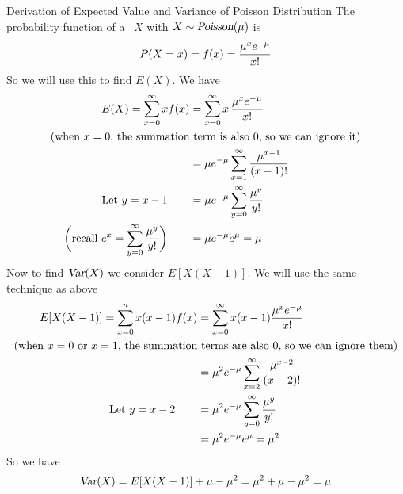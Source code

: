 \begin{theory}{Derivation of Expected Value and Variance of Poisson Distribution}
The probability function of a \rv~$X$ with $X \sim \operatorname{\textsl{Poisson}}(\mu)$ is
\[
    P(X = x) = f(x) = \frac{\mu^x e^{-\mu}}{x!}
\]
So we will use this to find $E(X)$. We have
\begin{align*}
    E(X) = \sum_{x = 0}^{\infty} xf(x) 
    &= \sum_{x = 0}^{\infty} x\,\frac{\mu^x e^{-\mu}}{x!} \\
    \text{(when $x = 0$, the summation}&\text{ term is also 0, so we can ignore it)} \\
    &= \mu e^{-\mu} \sum_{x = 1}^{\infty} \frac{\mu^{x-1}}{(x-1)!} \\
    \text{Let $y = x - 1$} \qquad
    &= \mu e^{-\mu} \sum_{y = 0}^{\infty} \frac{\mu^y}{y!} \\
    \biggl(\text{recall } e^x = \sum_{y = 0}^{\infty}\frac{\mu^y}{y!}\biggr) \qquad
    &= \mu e^{-\mu} e^{\mu} = \mu
\end{align*}
Now to find $\operatorname{\textsl{Var}}(X)$ we consider $E[X(X-1)]$. We will use the same technique as above
\begin{align*}
    E[X(X-1)] = \sum_{x = 0}^{n} x(x-1)f(x)
    &= \sum_{x = 0}^{\infty} x(x-1) \frac{\mu^x e^{-\mu}}{x!} \\
    \text{(when $x = 0$ or $x = 1$, the summation}&\text{ terms are also 0, so we can ignore them)} \\
    &= \mu^2  e^{-\mu} \sum_{x = 2}^{\infty} \frac{\mu^{x-2}}{(x-2)!} \\
    \text{Let $y = x - 2$} \qquad
    &= \mu^2  e^{-\mu} \sum_{y = 0}^{\infty} \frac{\mu^y}{y!} \\
    &= \mu^2 e^{-\mu} e^{\mu} = \mu^2
\end{align*}
So we have
\[
    \operatorname{\textsl{Var}}(X) = E[X(X-1)] + \mu - \mu^2 = \mu^2 + \mu - \mu^2 = \mu
\]
\end{theory}